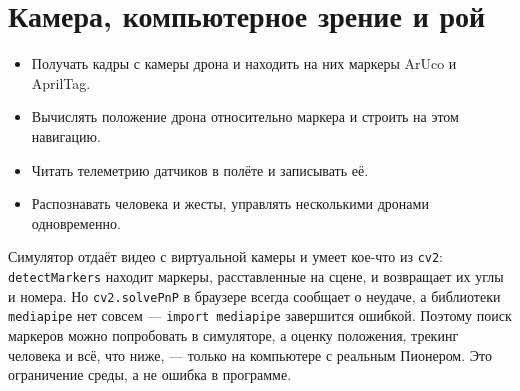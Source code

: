 \section{Камера, компьютерное зрение и рой}
\label{sec:python-vision}

\begin{infobox}
\begin{itemize}
    \item Получать кадры с камеры дрона и находить на них маркеры ArUco и AprilTag.
    \item Вычислять положение дрона относительно маркера и строить на этом навигацию.
    \item Читать телеметрию датчиков в полёте и записывать её.
    \item Распознавать человека и жесты, управлять несколькими дронами одновременно.
\end{itemize}
\end{infobox}

\begin{warnbox}
Симулятор отдаёт видео с виртуальной камеры и умеет кое-что из \texttt{cv2}: \texttt{detectMarkers} находит маркеры, расставленные на сцене, и возвращает их углы и номера. Но \texttt{cv2.solvePnP} в браузере всегда сообщает о неудаче, а библиотеки \texttt{mediapipe} нет совсем --- \texttt{import mediapipe} завершится ошибкой. Поэтому поиск маркеров можно попробовать в симуляторе, а оценку положения, трекинг человека и всё, что ниже, --- только на компьютере с реальным Пионером. Это ограничение среды, а не ошибка в программе.
\end{warnbox}
